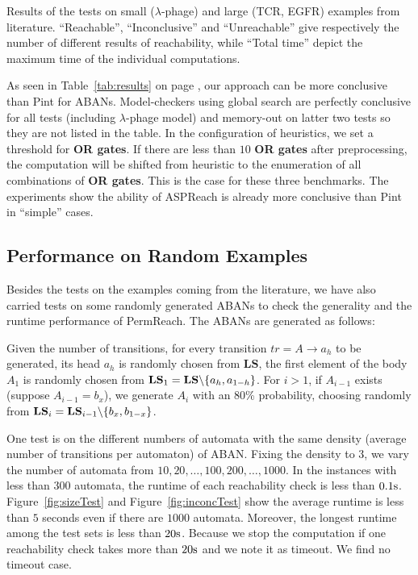 \begin{table}[ht]
\caption[Comparison of different analyzers]{
Results of the tests on small ($\lambda$-phage) and large (TCR, EGFR) examples from literature. 
``Reachable'', ``Inconclusive'' and ``Unreachable'' give respectively the number of different results of reachability, while ``Total time'' depict the maximum time of the individual computations.}\label{tab:results}
\end{table}

As seen in Table~\ref{tab:results} on page \pageref{tab:results}, our approach can be more conclusive than Pint for ABANs.
Model-checkers using global search are perfectly conclusive for all tests (including $\lambda$-phage model) and memory-out on latter two tests so they are not listed in the table.
In the configuration of heuristics, we set a threshold for \textbf{OR gates}.
If there are less than $10$ \textbf{OR gates} after preprocessing, the computation will be shifted from heuristic to the enumeration of all combinations of \textbf{OR gates}.
This is the case for these three benchmarks. The experiments show the ability of ASPReach is already more conclusive than Pint in ``simple'' cases.
\subsection{Performance on Random Examples}

Besides the tests on the examples coming from the literature, we have also carried tests on some randomly generated ABANs to check the generality and the runtime performance of PermReach. 
The ABANs are generated as follows:

Given the number of transitions, for every transition $tr=A\to a_h$ to be generated, its head $a_h$ is randomly chosen from $\mathbf{LS}$, the first element of the body $A_1$ is randomly chosen from $\mathbf{LS}_1=\mathbf{LS}\miset{a_h,a_{1-h}}$.
For $i>1$, if $A_{i-1}$ exists (suppose $A_{i-1}=b_x$), we generate $A_i$ with an 80\% probability, choosing randomly from $\mathbf{LS}_i=\mathbf{LS}_{i-1}\miset{b_x,b_{1-x}}$. 
 
One test is on the different numbers of automata with the same density (average number of transitions per automaton) of ABAN. Fixing the density to 3, we vary the number of automata from $10,20,\ldots,100,200,\ldots,1000$.
In the instances with less than 300 automata, the runtime of each reachability check is less than $0.1{\rm s}$.
Figure~\ref{fig:sizeTest} and Figure~\ref{fig:inconcTest} show the average runtime is less than $5$ seconds even if there are $1000$ automata. 
Moreover, the longest runtime among the test sets is less than $20{\rm s}$. 
Because we stop the computation if one reachability check takes more than $20{\rm s}$ and we note it as timeout.
We find no timeout case.

